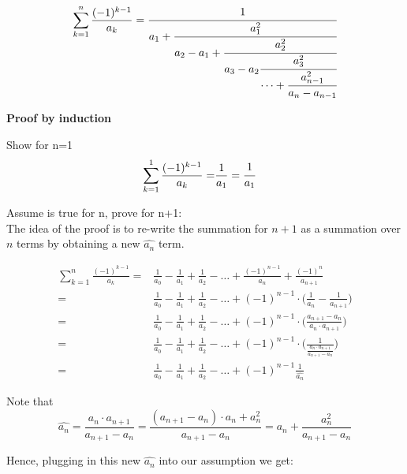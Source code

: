 \documentclass[a4paper]{article}
\begin{document}
    \begin{theorem}
        \label{relation_to_series}
        \[
        \sum_{k=1}^{n} \frac{(-1)^{k-1}}{a_k} = \cfrac{1}{a_1+\cfrac{a_{1}^{2}}{a_2 - a_1 +\cfrac{a_2^2}{a_3 - a_2
        \cfrac{a_3^2}{\cdots + \cfrac{a_{n-1}^2}{a_n - a_{n-1}}}}}}
        \]

        \textbf{Proof by induction}

        Show for n=1
        \begin{align*}
            \sum_{k=1}^{1} \frac{(-1)^{k-1}}{a_k} =& \frac{1}{a_1} = \cfrac{1}{a_1}
        \end{align*}

        Assume is true for n, prove for n+1:
        \\
        The idea of the proof is to re-write the summation for $n+1$ as a summation over $n$ terms by obtaining a new $\widehat{a_n}$ term.

        \begin{align*}
            \sum_{k=1}^{n} \frac{(-1)^{k-1}}{a_k} =& \frac{1}{a_0} - \frac{1}{a_1} + \frac{1}{a_2} - \dots + \frac{(-1)^{n-1}}{a_{n}} + \frac{(-1)^{n}}{a_{n+1}}
            \\
            =& \frac{1}{a_0} - \frac{1}{a_1} + \frac{1}{a_2} - \dots + (-1)^{n-1} \cdot \Big( \frac{1}{a_{n}} - \frac{1}{a_{n+1}} \Big)
            \\
            =& \frac{1}{a_0} - \frac{1}{a_1} + \frac{1}{a_2} - \dots + (-1)^{n-1} \cdot \Big( \frac{a_{n+1} - a_{n}}{a_{n}\cdot a_{n+1}} \Big)
            \\
            =& \frac{1}{a_0} - \frac{1}{a_1} + \frac{1}{a_2} - \dots + (-1)^{n-1} \cdot \Big( \frac{1}{\frac{a_{n}\cdot a_{n+1}}{a_{n+1} - a_{n}}}  \Big)
            \\
            =& \frac{1}{a_0} - \frac{1}{a_1} + \frac{1}{a_2} - \dots + (-1)^{n-1} \frac{1}{\widehat{a_n}}
        \end{align*}

        Note that
        \begin{equation*}
            \widehat{a_n}
            =
            \frac{a_{n}\cdot a_{n+1}}{a_{n+1} - a_{n}} =
            \frac{(a_{n+1} - a_n)\cdot a_{n} + a_n^2}{a_{n+1} - a_{n}} = a_{n} + \frac{a_n^2}{a_{n+1} - a_{n}}
        \end{equation*}

        Hence, plugging in this new $\widehat{a_n}$ into our assumption we get:


\end{theorem}
\end{document}
